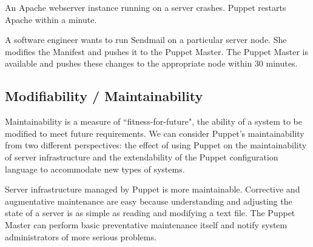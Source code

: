 \documentclass[a4paper]{article}
\begin{document}
An Apache webserver instance running on a server crashes. Puppet restarts Apache within a minute.

A software engineer wants to run Sendmail on a particular server node. She modifies the Manifest and pushes it to the Puppet Master. The Puppet Master is available and pushes these changes to the appropriate node within 30 minutes.

\subsection{Modifiability / Maintainability}






Maintainability is a measure of ``fitness-for-future", the ability of a system to be modified to meet future requirements. We can consider Puppet's maintainability from two different perspectives: the effect of using Puppet on the maintainability of server infrastructure and the extendability of the Puppet configuration language to accommodate new types of systems.

Server infrastructure managed by Puppet is more maintainable. Corrective and augmentative maintenance are easy because understanding and adjusting the state of a server is as simple as reading and modifying a text file. The Puppet Master can perform basic preventative maintenance itself and notify system administrators of more serious problems.
\end{document}

